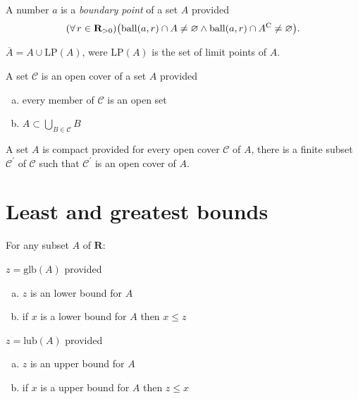 \documentclass[letterpaper,landscape,9pt,fleqn]{extarticle}
\newcommand{\reals}{\mathbf{R}}
\newcommand{\ball}{\mathrm{ball}}
\newcommand{\glb}{\mathrm{glb}}
\newcommand{\lub}{\mathrm{lub}}
\DeclarePairedDelimiter{\parens}{\lparen}{\rparen}
\newenvironment{alphalist}{
  \begin{enumerate}[(a)]
    \addtolength{\itemsep}{-1.0\itemsep}}
  {\end{enumerate}}
\begin{document}
\begin{multicols*}{3}
\begin{description}[\itemsep=0em]
    \item[Boundary point] A number $a$ is a \emph{boundary point} of a set $A$ provided
    \[ \parens*{\forall \, r \in \reals_{>0}} \parens*{\ball(a, r) \cap A \neq \varnothing  \land 
    \ball(a, r) \cap A^{\mathrm{C}} \neq \varnothing }. \]
   
    \item[Set closure] $\overline{A} = A \cup \mathrm{LP}(A)$, were $\mathrm{LP}(A)$ is the
    set of limit points of $A$.
    
    \item[Open cover] A set $\mathcal{C}$ is an open cover of a set $A$ provided 
     \begin{alphalist}
         \item every member of $\mathcal{C}$ is an open set
         \item $A \subset \underset{B \in \mathcal{C}}{\bigcup} B $
     \end{alphalist}

     \item[Compact] A set $A$ is compact provided for every 
     open cover $\mathcal{C}$ of $A$, there is a finite
     subset $\mathcal{C}^\prime$ of $\mathcal{C}$ such that
     $\mathcal{C}^\prime$ is an open cover of $A$.
     
    \end{description} 

\section*{Least and greatest bounds} 
For any subset $A$ of $\reals$:
\begin{description}[\itemsep=0em]
    \item[glb] $z = \glb(A)$ provided
    \begin{alphalist}
        \item $z$ is an lower bound for $A$
        \item if $x$ is a lower bound for $A$ then $x \leq z$
    \end{alphalist}
   \item[lub]  $z = \lub(A)$ provided
   \vspace{-0.1in}
   \begin{alphalist}
       \item $z$ is an upper bound for $A$
       \item if $x$ is a upper bound for $A$ then $z \leq x$
   \end{alphalist}
\end{description}   

\end{multicols*}
\end{document}
